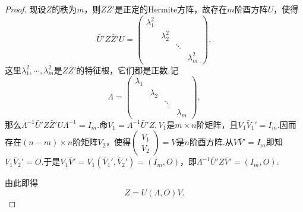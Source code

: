 \begin{proof}
	现设$Z$的秩为$m$，则$Z\bar{Z}'$是正定的Hermite方阵，故存在$m$阶酉方阵$U$，使得
	\[\bar{U}'Z\bar{Z}'U=\begin{pmatrix}
		\lambda_1^2 &&&\\
		&\lambda_2^2&&\\
		&&\ddots&\\
		&&&\lambda_m^2
	\end{pmatrix},\]
这里$\lambda_1^2,\cdots,\lambda_m^2$是$Z\bar{Z}'$的特征根，它们都是正数.记
\[\Lambda=\begin{pmatrix}
	\lambda_1 &&&\\
	&\lambda_2&&\\
	&&\ddots&\\
	&&&\lambda_m
\end{pmatrix},\]
那么$\Lambda^{-1}\bar{U}'Z\bar{Z}'U\Lambda^{-1}=I_m$.命$V_1=\Lambda^{-1}\bar{U}'Z,V_1$是$m\times n$阶矩阵，且$V_1\bar{V}_1'=I_m$.因而存在$(n-m)\times n$阶矩阵$V_2$，使得$\left(\begin{array}{c}
	V_1\\
	V_2
\end{array}\right)=V$是$n$阶酉方阵.从$V\bar{V}'=I_m$即知$V_1\bar{V}_2'=O$.于是$V_1\bar{V}'=V_1\left(\bar{V}_1',\bar{V}_2'\right)=\left(I_m,O\right)$，即$\Lambda^{-1}\bar{U}'Z\bar{V}'=\left(I_m,O\right)$.

由此即得
\[Z=U(\Lambda,O)V.\]


\end{proof}
